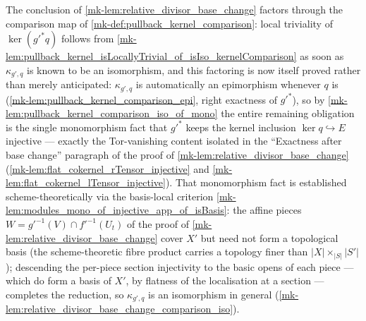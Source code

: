 \begin{remark}
  \label{mk-rem:relative_divisor_base_change_kernel_comparison}
  The conclusion of \ref{mk-lem:relative_divisor_base_change} factors through
  the comparison map of \ref{mk-def:pullback_kernel_comparison}: local
  triviality of \(\ker(g'^{*} q)\) follows from
  \ref{mk-lem:pullback_kernel_isLocallyTrivial_of_isIso_kernelComparison} as
  soon as \(\kappa_{g',q}\) is known to be an isomorphism, and this
  factoring is now itself proved rather than merely anticipated:
  \(\kappa_{g',q}\) is automatically an epimorphism whenever \(q\) is
  (\ref{mk-lem:pullback_kernel_comparison_epi}, right exactness of
  \(g'^{*}\)), so by \ref{mk-lem:pullback_kernel_comparison_iso_of_mono} the
  entire remaining obligation is the single monomorphism fact that
  \(g'^{*}\) keeps the kernel inclusion \(\ker q \hookrightarrow E\)
  injective --- exactly the Tor-vanishing content isolated in the
  ``Exactness after base change'' paragraph of the proof of
  \ref{mk-lem:relative_divisor_base_change}
  (\ref{mk-lem:flat_cokernel_rTensor_injective} and
  \ref{mk-lem:flat_cokernel_lTensor_injective}).
  That monomorphism fact is established scheme-theoretically via the
  basis-local criterion \ref{mk-lem:modules_mono_of_injective_app_of_isBasis}:
  the affine pieces \(W = g'^{-1}(V) \cap f'^{-1}(U_t)\) of the proof of
  \ref{mk-lem:relative_divisor_base_change} cover \(X'\) but need not form a
  topological basis (the scheme-theoretic fibre product carries a
  topology finer than \(|X| \times_{|S|} |S'|\)); descending the
  per-piece section injectivity to the basic opens of each piece --- which
  do form a basis of \(X'\), by flatness of the localisation at a section
  --- completes the reduction, so \(\kappa_{g',q}\) is an isomorphism in
  general (\ref{mk-lem:relative_divisor_base_change_comparison_iso}).
\end{remark}

